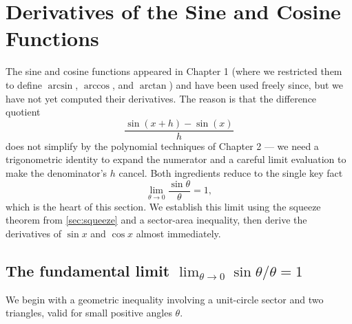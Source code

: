 \section{Derivatives of the Sine and Cosine Functions}\label{sec:sin-cos-derivatives}

The sine and cosine functions appeared in Chapter 1 (where we restricted them to define \(\arcsin\), \(\arccos\), and \(\arctan\)) and have been used freely since, but we have not yet computed their derivatives. The reason is that the difference quotient
\[
\frac{\sin(x + h) - \sin(x)}{h}
\]
does not simplify by the polynomial techniques of Chapter 2 --- we need a trigonometric identity to expand the numerator and a careful limit evaluation to make the denominator's \(h\) cancel. Both ingredients reduce to the single key fact
\[
\lim_{\theta \to 0} \frac{\sin \theta}{\theta} = 1,
\]
which is the heart of this section. We establish this limit using the squeeze theorem from \cref{sec:squeeze} and a sector-area inequality, then derive the derivatives of \(\sin x\) and \(\cos x\) almost immediately.

\subsection{The fundamental limit \texorpdfstring{$\lim_{\theta \to 0} \sin \theta / \theta = 1$}{lim sin theta / theta = 1}}

We begin with a geometric inequality involving a unit-circle sector and two triangles, valid for small positive angles \(\theta\).

